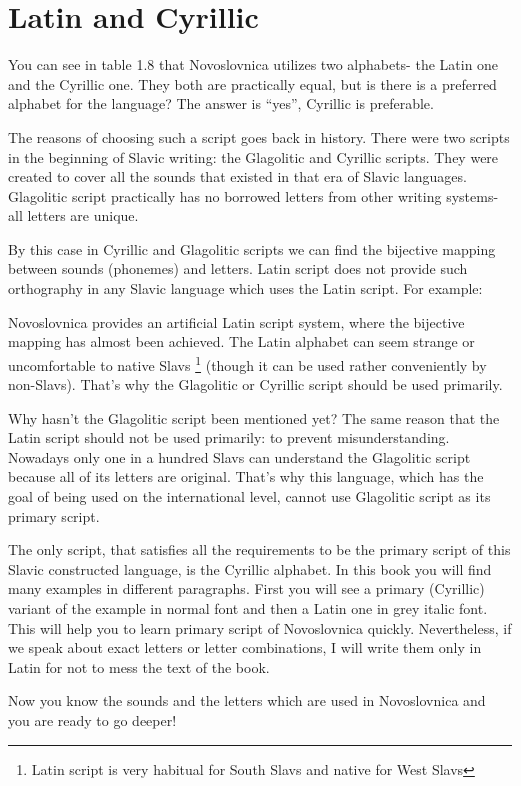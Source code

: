 \section{Latin and Cyrillic}

You can see in table 1.8 that Novoslovnica utilizes two alphabets- the Latin one and the Cyrillic one. They both are practically equal, but is there is a preferred alphabet for the language? The answer is “yes”, Cyrillic is preferable.

The reasons of choosing such a script goes back in history. There were two scripts in the beginning of Slavic writing: the Glagolitic and Cyrillic scripts. They were created to cover all the sounds that existed in that era of Slavic languages. Glagolitic script practically has no borrowed letters from other writing systems- all letters are unique.

By this case in Cyrillic and Glagolitic scripts we can find the bijective mapping between sounds (phonemes) and letters. Latin script does not provide such orthography in any Slavic language which uses the Latin script. For example:

Novoslovnica provides an artificial Latin script system, where the bijective mapping has almost been achieved. The Latin alphabet can seem strange or uncomfortable to native Slavs \footnote{Latin script is very habitual for South Slavs and native for West Slavs} (though it can be used rather conveniently by non-Slavs). That’s why the Glagolitic or Cyrillic script should be used primarily.


Why hasn’t the Glagolitic script been mentioned yet? The same reason that the Latin script should not be used primarily: to prevent misunderstanding. Nowadays only one in a hundred Slavs can understand the Glagolitic script because all of its letters are original. That’s why this language, which has the goal of being used on the international level, cannot use Glagolitic script as its primary script.

The only script, that satisfies all the requirements to be the primary script of this Slavic constructed language, is the Cyrillic alphabet. In this book you will find many examples in different paragraphs. First you will see a primary (Cyrillic) variant of the example in normal font and then a Latin one in grey italic font. This will help you to learn primary script of Novoslovnica quickly. Nevertheless, if we speak about exact letters or letter combinations, I will write them only in Latin for not to mess the text of the book.

Now you know the sounds and the letters which are used in Novoslovnica and you are ready to go deeper!
